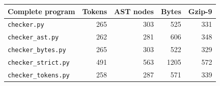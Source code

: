 \begin{tabular}{lrrrr}
\toprule
Complete program & Tokens & AST nodes & Bytes & Gzip-9\\
\midrule
\texttt{checker.py} & 265 & 303 & 525 & 331\\
\texttt{checker\_ast.py} & 262 & 281 & 606 & 348\\
\texttt{checker\_bytes.py} & 265 & 303 & 522 & 329\\
\texttt{checker\_strict.py} & 491 & 563 & 1205 & 572\\
\texttt{checker\_tokens.py} & 258 & 287 & 571 & 339\\
\bottomrule
\end{tabular}
